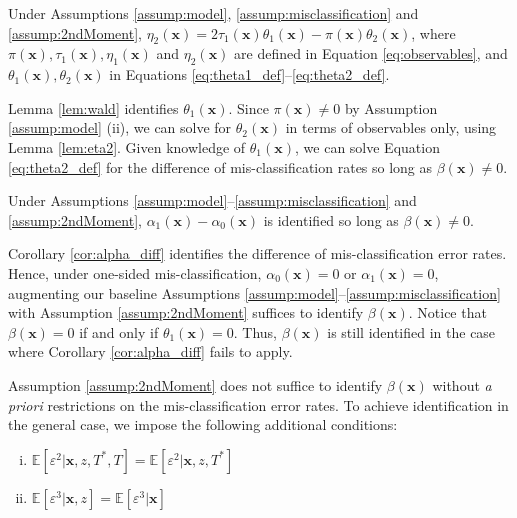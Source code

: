 \begin{lem} Under Assumptions \ref{assump:model}, \ref{assump:misclassification} and \ref{assump:2ndMoment}, $\eta_2(\mathbf{x}) =  2\tau_1(\mathbf{x}) \theta_1(\mathbf{x}) - \pi(\mathbf{x})\theta_2(\mathbf{x})$,
  where $\pi(\mathbf{x}), \tau_1(\mathbf{x}), \eta_1(\mathbf{x})$ and $\eta_2(\mathbf{x})$ are defined in Equation \ref{eq:observables}, and $\theta_1(\mathbf{x}),\theta_2(\mathbf{x})$ in Equations \ref{eq:theta1_def}--\ref{eq:theta2_def}.
  \label{lem:eta2}
\end{lem}

Lemma \ref{lem:wald} identifies $\theta_1(\mathbf{x})$.
Since $\pi(\mathbf{x}) \neq 0$ by Assumption \ref{assump:model} (ii), we can solve for $\theta_2(\mathbf{x})$ in terms of observables only, using Lemma \ref{lem:eta2}.
Given knowledge of $\theta_1(\mathbf{x})$, we can solve Equation \ref{eq:theta2_def} for the difference of mis-classification rates so long as $\beta(\mathbf{x}) \neq 0$.

\begin{cor}
  Under Assumptions \ref{assump:model}--\ref{assump:misclassification} and \ref{assump:2ndMoment}, $\alpha_1(\mathbf{x}) - \alpha_0(\mathbf{x})$ is identified so long as $\beta(\mathbf{x}) \neq 0$.
  \label{cor:alpha_diff}
\end{cor}
Corollary \ref{cor:alpha_diff} identifies the difference of mis-classification error rates.
Hence, under one-sided mis-classification, $\alpha_0(\mathbf{x}) = 0$ or $\alpha_1(\mathbf{x}) = 0$, augmenting our baseline Assumptions \ref{assump:model}--\ref{assump:misclassification} with Assumption \ref{assump:2ndMoment} suffices to identify $\beta(\mathbf{x})$.
Notice that $\beta(\mathbf{x})=0$ if and only if $\theta_1(\mathbf{x}) = 0$.
Thus, $\beta(\mathbf{x})$ is still identified in the case where Corollary \ref{cor:alpha_diff} fails to apply.

Assumption \ref{assump:2ndMoment} does not suffice to identify $\beta(\mathbf{x})$ without \emph{a priori} restrictions on the mis-classification error rates.
To achieve identification in the general case, we impose the following additional conditions:
\begin{assump} \mbox{}
  \label{assump:3rdMoment}
  \begin{enumerate}[(i)] 
    \item $\mathbb{E}[\varepsilon^2|\mathbf{x},z,T^*,T] = \mathbb{E}[\varepsilon^2|\mathbf{x},z, T^*]$
    \item $\mathbb{E}[\varepsilon^3|\mathbf{x},z] = \mathbb{E}[\varepsilon^3|\mathbf{x}]$
  \end{enumerate}
\end{assump}

